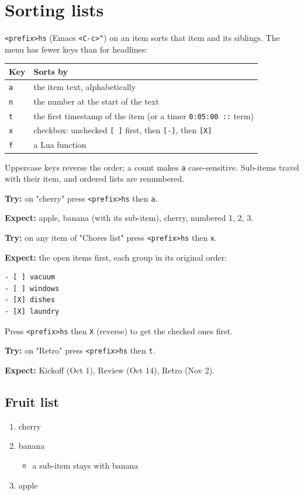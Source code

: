 \section{Sorting lists}
\label{sec:orgb0f1a4e}
\texttt{<prefix>hs} (Emacs \texttt{<C-c>\textasciicircum{}}) on an item sorts that item and its siblings.
The menu has fewer keys than for headlines:

\begin{center}
\begin{tabular}{ll}
Key & Sorts by\\
\hline
\texttt{a} & the item text, alphabetically\\
\texttt{n} & the number at the start of the text\\
\texttt{t} & the first timestamp of the item (or a timer \texttt{0:05:00 ::} term)\\
\texttt{x} & checkbox: unchecked \texttt{[ ]} first, then \texttt{[-]}, then \texttt{[X]}\\
\texttt{f} & a Lua function\\
\end{tabular}
\end{center}

Uppercase keys reverse the order; a count makes \texttt{a} case-sensitive.
Sub-items travel with their item, and ordered lists are renumbered.

\textbf{Try:} on "cherry" press \texttt{<prefix>hs} then \texttt{a}.

\textbf{Expect:} apple, banana (with its sub-item), cherry, numbered 1, 2, 3.

\textbf{Try:} on any item of "Chores list" press \texttt{<prefix>hs} then \texttt{x}.

\textbf{Expect:} the open items first, each group in its original order:
\begin{verbatim}
- [ ] vacuum
- [ ] windows
- [X] dishes
- [X] laundry
\end{verbatim}
Press \texttt{<prefix>hs} then \texttt{X} (reverse) to get the checked ones first.

\textbf{Try:} on "Retro" press \texttt{<prefix>hs} then \texttt{t}.

\textbf{Expect:} Kickoff (Oct 1), Review (Oct 14), Retro (Nov 2).
\subsection{Fruit list}
\label{sec:orgf7915eb}
\begin{enumerate}
\item cherry
\item banana
\begin{itemize}
\item a sub-item stays with banana
\end{itemize}
\item apple
\end{enumerate}
